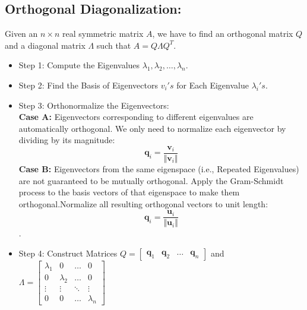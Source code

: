 \documentclass[DIV=20,oneside]{scrartcl}
\begin{document}
\begin{itemize}
	
	
	\subsection{Orthogonal Diagonalization:} Given an $n \times n$ real symmetric matrix $A$, we have to find an orthogonal matrix $Q$ and a diagonal matrix $\Lambda$ such that $A = Q \Lambda Q^T$.
	\begin{itemize}
		\item Step 1: Compute the Eigenvalues $\lambda_1, \lambda_2, \dots, \lambda_n$.
		\item Step 2: Find the Basis of Eigenvectors $v_i's$ for Each Eigenvalue $\lambda_i's$.
		\item Step 3: Orthonormalize the Eigenvectors:\\ \textbf{Case A: }Eigenvectors corresponding to different eigenvalues are automatically orthogonal. We only need to normalize each eigenvector by dividing by its magnitude:
		$$\mathbf{q}_i = \frac{\mathbf{v}_i}{\Vert{}\mathbf{v}_i\Vert{}}$$
		\textbf{Case B: }Eigenvectors from the same eigenspace (i.e., Repeated Eigenvalues) are not guaranteed to be mutually orthogonal. Apply the Gram-Schmidt process to the basis vectors of that eigenspace to make them orthogonal.Normalize all resulting orthogonal vectors to unit length:
		$$\mathbf{q}_i = \frac{\mathbf{u}_i}{\Vert{}\mathbf{u}_i\Vert{}}$$.
		\item Step 4: Construct Matrices $Q = \begin{bmatrix} \mathbf{q}_1 & \mathbf{q}_2 & \dots & \mathbf{q}_n \end{bmatrix}$ and $\Lambda = \begin{bmatrix} \lambda_1 & 0 & \dots & 0 \\ 0 & \lambda_2 & \dots & 0 \\ \vdots & \vdots & \ddots & \vdots \\ 0 & 0 & \dots & \lambda_n \end{bmatrix}$		
	\end{itemize}
	

\end{itemize}
\end{document}
